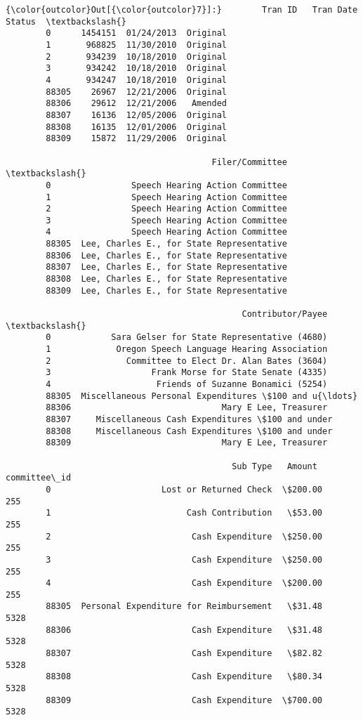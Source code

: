 \documentclass[11pt]{article}
\begin{document}
\begin{Verbatim}[commandchars=\\\{\}]
{\color{outcolor}Out[{\color{outcolor}7}]:}        Tran ID   Tran Date    Status  \textbackslash{}
        0      1454151  01/24/2013  Original   
        1       968825  11/30/2010  Original   
        2       934239  10/18/2010  Original   
        3       934242  10/18/2010  Original   
        4       934247  10/18/2010  Original   
        88305    26967  12/21/2006  Original   
        88306    29612  12/21/2006   Amended   
        88307    16136  12/05/2006  Original   
        88308    16135  12/01/2006  Original   
        88309    15872  11/29/2006  Original   
        
                                         Filer/Committee  \textbackslash{}
        0                Speech Hearing Action Committee   
        1                Speech Hearing Action Committee   
        2                Speech Hearing Action Committee   
        3                Speech Hearing Action Committee   
        4                Speech Hearing Action Committee   
        88305  Lee, Charles E., for State Representative   
        88306  Lee, Charles E., for State Representative   
        88307  Lee, Charles E., for State Representative   
        88308  Lee, Charles E., for State Representative   
        88309  Lee, Charles E., for State Representative   
        
                                               Contributor/Payee  \textbackslash{}
        0            Sara Gelser for State Representative (4680)   
        1             Oregon Speech Language Hearing Association   
        2               Committee to Elect Dr. Alan Bates (3604)   
        3                    Frank Morse for State Senate (4335)   
        4                     Friends of Suzanne Bonamici (5254)   
        88305  Miscellaneous Personal Expenditures \$100 and u{\ldots}   
        88306                              Mary E Lee, Treasurer   
        88307     Miscellaneous Cash Expenditures \$100 and under   
        88308     Miscellaneous Cash Expenditures \$100 and under   
        88309                              Mary E Lee, Treasurer   
        
                                             Sub Type   Amount committee\_id  
        0                      Lost or Returned Check  \$200.00          255  
        1                           Cash Contribution   \$53.00          255  
        2                            Cash Expenditure  \$250.00          255  
        3                            Cash Expenditure  \$250.00          255  
        4                            Cash Expenditure  \$200.00          255  
        88305  Personal Expenditure for Reimbursement   \$31.48         5328  
        88306                        Cash Expenditure   \$31.48         5328  
        88307                        Cash Expenditure   \$82.82         5328  
        88308                        Cash Expenditure   \$80.34         5328  
        88309                        Cash Expenditure  \$700.00         5328  
\end{Verbatim}
            
\end{document}
